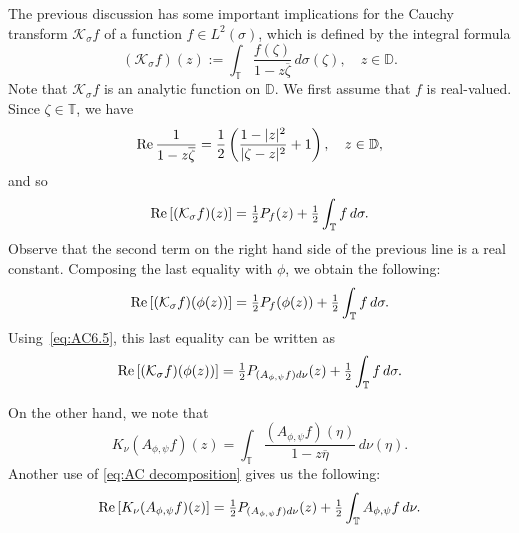 \documentclass[11pt]{amsart}
\def\D{\mathbb{D}}
\def\T{\mathbb{T}}
\def\KK{{\mathcal K}}
\renewcommand{\Re}{\mathop{\rm Re}}
\numberwithin{equation}{section}
\theoremstyle{plain}
\theoremstyle{definition}
\begin{document}
The previous discussion has some important implications for the Cauchy transform $\mathcal{K}_{\sigma} f$ of a function $ f\in L^2(\sigma) $, which is defined by the integral formula 
\[
(\KK_\sigma f)(z):=\int_{\T}\frac{f(\zeta)}{1-z\overline{\zeta}}\, d\sigma(\zeta), \quad z \in \D.
\]
Note that $\mathcal{K}_{\sigma} f$ is an analytic function on $\D$.
We first assume that $ f $ is real-valued. Since $\zeta \in \T$, we have 
\begin{equation}\label{eq:AC decomposition}
\Re \frac{1}{1-z\overline{\zeta}}=\frac{1}{2}\left( \frac{1-|z|^2}{|\zeta-z|^2}+1 \right), \quad z \in \D,
\end{equation}
and so 
\[
\Re \left[(\KK_\sigma f)(z)\right] =\tfrac{1}{2}P_{f}(z)+
\tfrac{1}{2}\int_{\T}f\,d\sigma.
\]
Observe that the second term on the right hand side of the previous line is a real constant.
Composing the last equality with $ \phi $, we obtain the following: 
\[
\Re \left[(\KK_\sigma f)(\phi(z))\right]= \tfrac{1}{2}P_{f}(\phi(z))+
\tfrac{1}{2}\int_{\T} f\,d\sigma.
\]
Using~\eqref{eq:AC6.5}, this last equality can be written as
\begin{equation}\label{eq:AC4}
\Re \left[(\KK_\sigma f)(\phi(z))\right]= \tfrac{1}{2}P_{(A_{\phi, \psi} f) d\nu}(z)+
\tfrac{1}{2}\int_{\T} f\,d\sigma.
\end{equation}

On the other hand, we note that 
\[
K_\nu (A_{\phi, \psi} f)(z)=\int_{\T}\frac{(A_{\phi, \psi} f)(\eta)}{1-z\overline{\eta}}\,d\nu(\eta).
\]
Another use of \eqref{eq:AC decomposition} gives us the following: 
\begin{equation}\label{eq:AC5}
\Re \left[K_\nu (A_{\phi, \psi} f)(z)\right]=\tfrac{1}{2}P_{(A_{\phi, \psi} f)d\nu}(z)+\tfrac{1}{2}\int_{\T}A_{\phi, \psi} f\, d\nu.
\end{equation}
\end{document}
